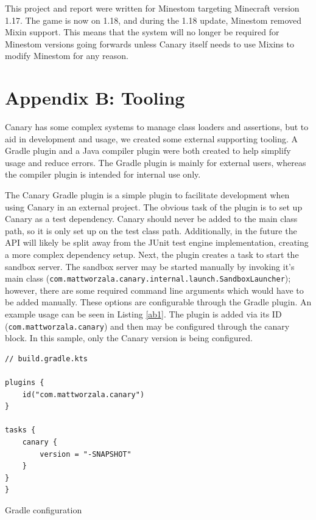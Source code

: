 \documentclass[12pt]{article}
\def\code#1{\texttt{#1}}
\begin{document}
\begin{onehalfspacing}



This project and report were written for Minestom targeting Minecraft
version 1.17. The game is now on 1.18, and during the 1.18 update,
Minestom removed Mixin support. This means that the system will no
longer be required for Minestom versions going forwards unless Canary
itself needs to use Mixins to modify Minestom for any reason.

\newpage
{}
\section*{Appendix B: Tooling}\label{appendixb}

Canary has some complex systems to manage class loaders and assertions,
but to aid in development and usage, we created some external supporting
tooling. A Gradle plugin and a Java compiler plugin were both created to
help simplify usage and reduce errors. The Gradle plugin is mainly for
external users, whereas the compiler plugin is intended for internal use
only.

The Canary Gradle plugin is a simple plugin to facilitate development
when using Canary in an external project. The obvious task of the plugin
is to set up Canary as a test dependency. Canary should never be added
to the main class path, so it is only set up on the test class path.
Additionally, in the future the API will likely be split away from the
JUnit test engine implementation, creating a more complex dependency
setup. Next, the plugin creates a task to start the sandbox server. The
sandbox server may be started manually by invoking it's main class
(\code{com.mattworzala.canary.internal.launch.SandboxLauncher}); however, there
are some required command line arguments which would have to be added
manually. These options are configurable through the Gradle plugin. An
example usage can be seen in Listing \ref{ab1}. The plugin is added via its
ID (\code{com.mattworzala.canary}) and then may be configured through the
canary block. In this sample, only the Canary version is being
configured.

\begin{listing}[H]
\begin{verbatim}
// build.gradle.kts

plugins {
    id("com.mattworzala.canary")
}

tasks {
    canary {
        version = "-SNAPSHOT"
    }
}
}
\end{verbatim}
\caption{Gradle configuration}
\label{lst:ab1}
\end{listing}


\end{onehalfspacing}
\end{document}
